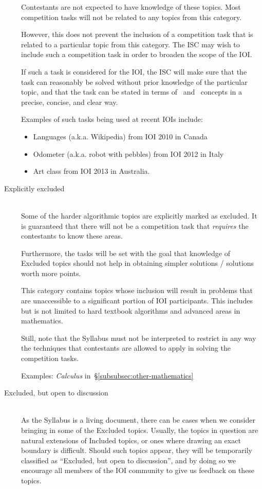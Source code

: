 \documentclass[a4paper,11pt,oneside]{article}
\newcommand{\cmark}{\ding{51}}%
\newcommand{\xmark}{\ding{55}}%
\newcommand{\cincl}{{\small\cmark}}
\newcommand{\cdefi}{{\small\cmark\faFileTextO}}
\newcommand{\cemay}{{\small\xmark\faQuestionCircle}}
\newcommand{\cexcl}{{\small\xmark}}
\begin{document}
\begin{description}
    Contestants are not expected to have knowledge of these topics.
    Most competition tasks will not be related to any topics 
    from this category.

    However, this does not prevent the inclusion of 
    a competition task that is related to a particular topic
    from this category. The ISC may wish to include such a competition 
    task in order to broaden the scope of the IOI.
    
    If such a task is considered for the IOI,
    the ISC will make sure that the task can reasonably be solved
    without prior knowledge of the particular topic, and that 
    the task can be stated
    in terms of \cincl\ and \cdefi\ concepts in a precise, concise, 
    and clear way.

    Examples of such tasks being used at recent IOIs include:
    \begin{itemize}
    \itemsep -3pt
    \item Languages (a.k.a. Wikipedia) from IOI 2010 in Canada
    \item Odometer (a.k.a. robot with pebbles) from IOI 2012 in Italy
    \item Art class from IOI 2013 in Australia.
    \end{itemize}


\item[\cexcl\ Explicitly excluded]~\\
    Some of the harder algorithmic topics are explicitly marked as excluded.
    It is guaranteed that there will not be a competition
    task that \emph{requires} the contestants to know these areas.

    Furthermore, the tasks will be set with the goal that knowledge of 
    Excluded topics should not help in obtaining simpler solutions / solutions 
    worth more points.

    This category contains topics whose inclusion will result in
    problems that are unaccessible to a significant portion of IOI participants.
    This includes but is not limited to hard textbook algorithms and advanced
    areas in mathematics.

    Still, note that the Syllabus must not be interpreted to restrict in 
    any way the techniques that contestants are allowed to apply in solving 
    the competition tasks.
    
    Examples: \emph{Calculus\/} in~\S\ref{subsubsec:other-mathematics}

\item[\cemay\ Excluded, but open to discussion]~\\
    As the Syllabus is a living document, there can be cases when we consider
    bringing in some of the Excluded topics. Usually, the topics in question
    are natural extensions of Included topics, or ones where drawing an exact
    boundary is difficult. Should such topics appear, they will be temporarily
    classified as ``Excluded, but open to discussion'', and by doing so we encourage 
    all members of the IOI community to give us feedback on these topics.
\end{description}
\end{document}
